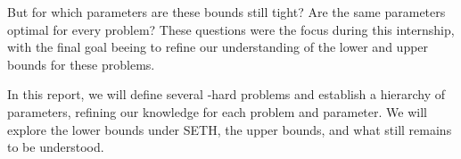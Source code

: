 


But for which parameters are these bounds still tight? Are the same parameters optimal for every problem? These questions were the focus during this internship, with the final goal beeing to refine our understanding of the lower and upper bounds for these problems.

In this report, we will define several \NP-hard problems and establish a hierarchy of parameters, refining our knowledge for each problem and parameter. We will explore the lower bounds under SETH, the upper bounds, and what still remains to be understood.
